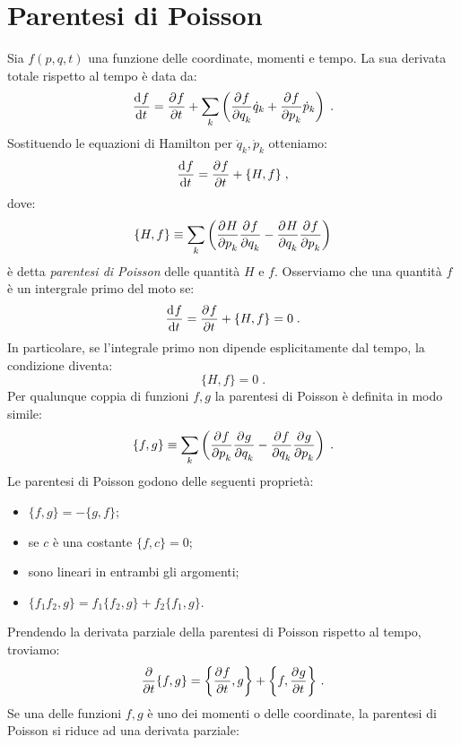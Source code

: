 \section{Parentesi di Poisson}
Sia $f(p,q,t)$ una funzione delle coordinate, momenti e tempo. La sua derivata totale rispetto al tempo è data da:
\begin{equation}
\frac{\mathrm{d}^{}f}{\mathrm{d}t^{}}=\frac{\partial^{}f}{\partial t^{}}+\sum_k\left(\frac{\partial^{}f}{\partial q_k^{}}\dot{q}_k+\frac{\partial^{}f}{\partial p_k^{}}\dot{p}_k\right)\;.
\end{equation}
Sostituendo le equazioni di Hamilton per $\dot{q}_k,\dot{p}_k$ otteniamo:
\begin{equation}
\frac{\mathrm{d}^{}f}{\mathrm{d}t^{}}=\frac{\partial^{}f}{\partial t^{}}+\{H,f\}\;,
\end{equation}
dove:
\begin{equation}
\{H,f\}\equiv \sum_k\left(\frac{\partial^{}H}{\partial p_k^{}}\frac{\partial^{}f}{\partial q_k^{}}-\frac{\partial^{}H}{\partial q_k^{}}\frac{\partial^{}f}{\partial p_k^{}}\right)
\end{equation}
è detta \emph{parentesi di Poisson} delle quantità $H$ e $f$. Osserviamo che una quantità $f$ è un intergrale primo del moto se:
\begin{equation}
\frac{\mathrm{d}^{}f}{\mathrm{d}t^{}}=\frac{\partial^{}f}{\partial t^{}}+\{H,f\}=0\;.
\end{equation}
In particolare, se l'integrale primo non dipende esplicitamente dal tempo, la condizione diventa:
\begin{equation}
\{H, f\}=0\;.
\end{equation}
Per qualunque coppia di funzioni $f,g$ la parentesi di Poisson è definita in modo simile:
\begin{equation}
\{f,g\} \equiv \sum_k\left(\frac{\partial^{}f}{\partial p_k^{}}\frac{\partial^{}g}{\partial q_k^{}}-\frac{\partial^{}f}{\partial q_k^{}}\frac{\partial^{}g}{\partial p_k^{}}\right)\;.
\end{equation}
Le parentesi di Poisson godono delle seguenti proprietà:
\begin{itemize}
\item $\{f,g\}=-\{g,f\}$;
\item se $c$ è una costante $\{f,c\}=0$;
\item sono lineari in entrambi gli argomenti;
\item $\{f_1f_2,g\}=f_1\{f_2,g\}+f_2\{f_1,g\}$.
\end{itemize}
Prendendo la derivata parziale della parentesi di Poisson rispetto al tempo, troviamo:
\begin{equation}
\frac{\partial}{\partial t}\{f,g\}=\left\{\frac{\partial^{}f}{\partial t^{}},g\right\}+\left\{f,\frac{\partial^{}g}{\partial t^{}}\right\}\,.
\end{equation}
Se una delle funzioni $f,g$ è uno dei momenti o delle coordinate, la parentesi di Poisson si riduce ad una derivata parziale:
